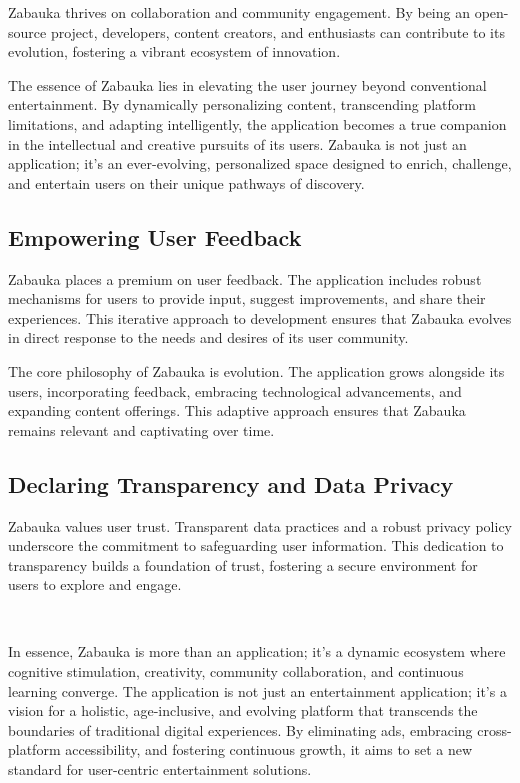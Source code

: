 Zabauka thrives on collaboration and community engagement. By being an open-source project, developers, content creators, 
and enthusiasts can contribute to its evolution, fostering a vibrant ecosystem of innovation.

The essence of Zabauka lies in elevating the user journey beyond conventional entertainment. By dynamically 
personalizing content, transcending platform limitations, and adapting intelligently, the application becomes a true 
companion in the intellectual and creative pursuits of its users. Zabauka is not just an application; it's an 
ever-evolving, personalized space designed to enrich, challenge, and entertain users on their unique pathways of 
discovery.


\subsection{Empowering User Feedback}

Zabauka places a premium on user feedback. The application includes robust mechanisms for users to provide input, 
suggest improvements, and share their experiences. This iterative approach to development ensures that Zabauka evolves 
in direct response to the needs and desires of its user community.

The core philosophy of Zabauka is evolution. The application grows alongside its users, incorporating feedback, 
embracing technological advancements, and expanding content offerings. This adaptive approach ensures that Zabauka 
remains relevant and captivating over time.


\subsection{Declaring Transparency and Data Privacy}

Zabauka values user trust. Transparent data practices and a robust privacy policy underscore the commitment to 
safeguarding user information. This dedication to transparency builds a foundation of trust, fostering a secure 
environment for users to explore and engage.

~

In essence, Zabauka is more than an application; it's a dynamic ecosystem where cognitive stimulation, creativity, 
community collaboration, and continuous learning converge. The application is not just an entertainment application; 
it's a vision for a holistic, age-inclusive, and evolving platform that transcends the boundaries of traditional digital 
experiences. By eliminating ads, embracing cross-platform accessibility, and fostering continuous growth, it aims to set 
a new standard for user-centric entertainment solutions.
